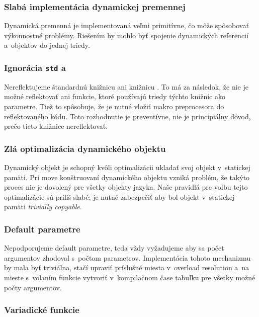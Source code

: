 \subsubsection{Slabá implementácia dynamickej premennej}

Dynamická premenná je implementovaná veľmi primitívne, čo môže spôsobovať výkonnostné problémy. Riešením by mohlo byť spojenie dynamických referencií a~objektov do jednej triedy.

\subsubsection{Ignorácia \texttt{std} a~\PPreflection{}}

Nereflektujeme štandardnú knižnicu ani knižnicu \PPreflection{}. To má za následok, že nie je možné reflektovať ani funkcie, ktoré používajú triedy týchto knižníc ako parametre. Tiež to spôsobuje, že je nutné vložiť makro preprocesora do reflektovaného kódu. Toto rozhodnutie je preventívne, nie je principiálny dôvod, prečo tieto knižnice nereflektovať.

\subsubsection{Zlá optimalizácia dynamického objektu}

Dynamický objekt je schopný kvôli optimalizácii ukladať svoj objekt v~statickej pamäti. Pri move konštruovaní dynamického objektu vzniká problém, že takýto proces nie je dovolený pre všetky objekty jazyka. Naše pravidlá pre voľbu tejto optimalizácie sú príliš slabé; je nutné zabezpečiť aby bol objekt v~statickej pamäti \emph{trivially copyable}.

\subsubsection{Default parametre}

Nepodporujeme default parametre, teda vždy vyžadujeme aby sa počet argumentov zhodoval s~počtom parametrov. Implementácia tohoto mechanizmu by mala byť triviálna, stačí upraviť príslušné miesta v~overload resolution a~na mieste s~volaním funkcie vytvoriť v~kompilačnom čase tabuľku pre všetky možné počty argumentov.

\subsubsection{Variadické funkcie}

